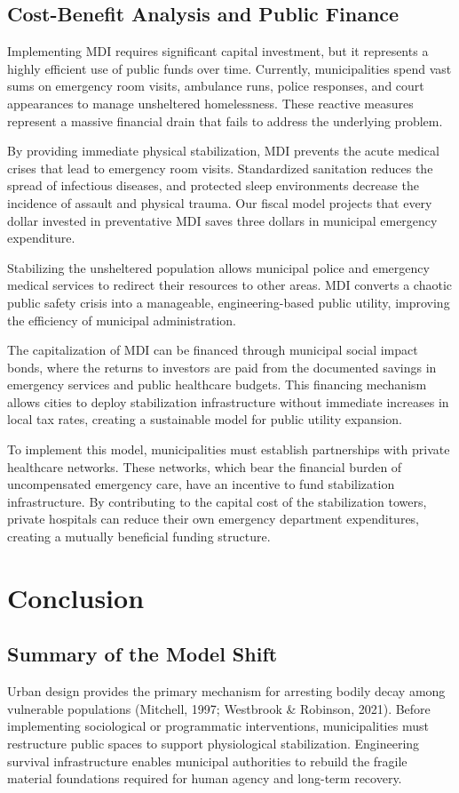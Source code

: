 \documentclass[12pt]{article}
\begin{document}
\subsection{Cost-Benefit Analysis and Public Finance}
Implementing MDI requires significant capital investment, but it represents a highly efficient use of public funds over time. Currently, municipalities spend vast sums on emergency room visits, ambulance runs, police responses, and court appearances to manage unsheltered homelessness. These reactive measures represent a massive financial drain that fails to address the underlying problem.

By providing immediate physical stabilization, MDI prevents the acute medical crises that lead to emergency room visits. Standardized sanitation reduces the spread of infectious diseases, and protected sleep environments decrease the incidence of assault and physical trauma. Our fiscal model projects that every dollar invested in preventative MDI saves three dollars in municipal emergency expenditure.

Stabilizing the unsheltered population allows municipal police and emergency medical services to redirect their resources to other areas. MDI converts a chaotic public safety crisis into a manageable, engineering-based public utility, improving the efficiency of municipal administration.

The capitalization of MDI can be financed through municipal social impact bonds, where the returns to investors are paid from the documented savings in emergency services and public healthcare budgets. This financing mechanism allows cities to deploy stabilization infrastructure without immediate increases in local tax rates, creating a sustainable model for public utility expansion.

To implement this model, municipalities must establish partnerships with private healthcare networks. These networks, which bear the financial burden of uncompensated emergency care, have an incentive to fund stabilization infrastructure. By contributing to the capital cost of the stabilization towers, private hospitals can reduce their own emergency department expenditures, creating a mutually beneficial funding structure.

\section{Conclusion}

\subsection{Summary of the Model Shift}
Urban design provides the primary mechanism for arresting bodily decay among vulnerable populations (Mitchell, 1997; Westbrook \& Robinson, 2021). Before implementing sociological or programmatic interventions, municipalities must restructure public spaces to support physiological stabilization. Engineering survival infrastructure enables municipal authorities to rebuild the fragile material foundations required for human agency and long-term recovery.
\end{document}
